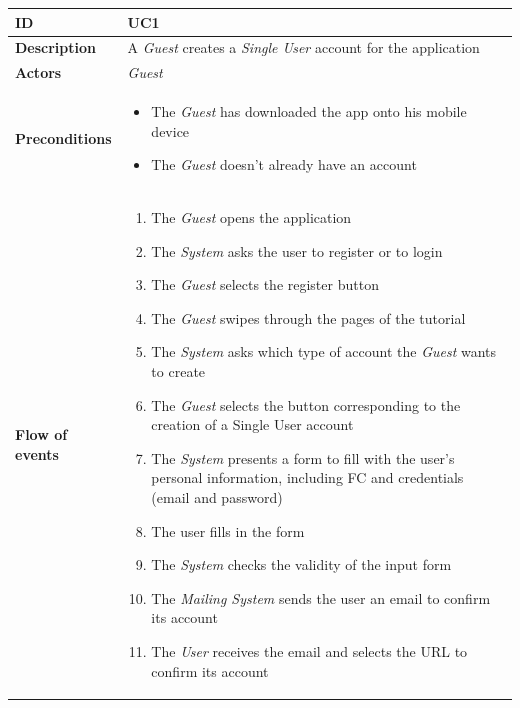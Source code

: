 \documentclass[titlepage]{article}
\begin{document}
			\begin{longtable}{| p{3 cm} | p{10 cm} |} 
			\hline
			{\bf ID} & UC1 \\
			\hline
			{\bf Description} & A {\it {\it Guest}} creates a {\it Single User} account for the application \\
			\hline
			{\bf Actors} & {\it {\it Guest}} \\
			\hline
			{\bf Preconditions} & 		
							\begin{itemize}
								\item The {\it {\it Guest}}  has downloaded the app onto his mobile device
								\item The {\it {\it Guest}}  doesn’t already have an account
							\end{itemize}
			\\
			\hline
			{\bf Flow of events} & 
							\begin{enumerate}
								\item The {\it {\it Guest}} opens the application
								\item The {\it System} asks the user to register or to login
								\item The {\it {\it Guest}} selects the register button
								\item The {\it {\it Guest}} swipes through the pages of the tutorial
								\item The {\it System}  asks which type of account the {\it {\it Guest}} wants to create
								\item The {\it {\it Guest}} selects the button corresponding to the creation of a Single 									User account
								\item The {\it System}  presents a form to fill with the user’s personal information, including FC  and credentials (email and password) 
								\item The user fills in the form
								\item The {\it System}  checks the validity of the input form
								\item The {\it Mailing {\it System}} sends the user an email to confirm its account
								\item The {\it User} receives the email and selects the URL to confirm its account
							\end{enumerate}
			

\end{longtable}
\end{document}
